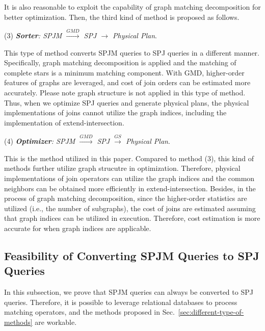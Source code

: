It is also reasonable to exploit the capability of graph matching decomposition for better optimization.
Then, the third kind of method is proposed as follows.

(3) \emph{\textbf{Sorter}: SPJM $\xrightarrow{GMD}$ SPJ $\rightarrow$ Physical Plan}.

This type of method converts SPJM queries to SPJ queries in a different manner.
Specifically, graph matching decomposition is applied and the matching of complete stars is a minimum matching component.
With GMD, higher-order features of graphs are leveraged, and cost of join orders can be estimated more accurately.
Please note graph structure is not applied in this type of method.
Thus, when we optimize SPJ queries and generate physical plans, the physical implementations of joins cannot utilize the graph indices, including the implementation of extend-intersection.


(4) \emph{\textbf{Optimizer}: SPJM $\xrightarrow{GMD}$ SPJ $\xrightarrow{GS}$ Physical Plan}.

This is the method utilized in this paper.
Compared to method (3), this kind of methods further utilize graph strucutre in optimization.
Therefore, physical implementations of join operators can utilize the graph indices and the common neighbors can be obtained more efficiently in extend-intersection.
Besides, in the process of graph matching decomposition, since the higher-order statistics are utilized (i.e., the number of subgraphs), the cost of joins are estimated assuming that graph indices can be utilized in execution.
Therefore, cost estimation is more accurate for when graph indices are applicable.

\subsection{Feasibility of Converting SPJM Queries to SPJ Queries}
In this subsection, we prove that SPJM queries can always be converted to SPJ queries.
Therefore, it is possible to leverage relational databases to process matching operators, and the methods proposed in Sec.~\ref{sec:different-type-of-methods} are workable.

